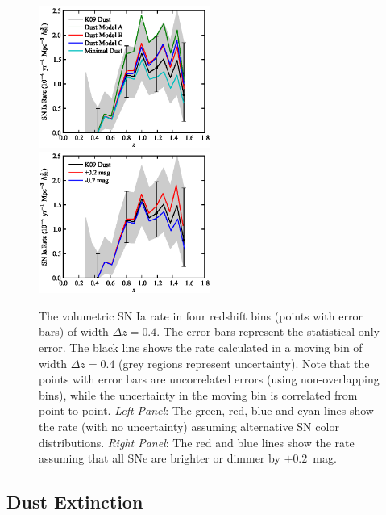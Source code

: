 \begin{figure}
\begin{center}
\includegraphics[width=0.5\textwidth]{figures/fieldrate/fieldrates1.eps}%
\includegraphics[width=0.5\textwidth]{figures/fieldrate/fieldrates2.eps}
\end{center}
\caption[Volumetric SN Ia rate results with systematic 
uncertainties]{The volumetric SN Ia rate in four redshift bins (points
with error bars) of width $\Delta z = 0.4$. The error bars represent
the statistical-only error. The black line shows the rate calculated
in a moving bin of width $\Delta z = 0.4$ (grey regions represent
uncertainty). Note that the points with error bars are uncorrelated
errors (using non-overlapping bins), while the uncertainty in the
moving bin is correlated from point to point.
\emph{Left Panel}: The green, red, blue and cyan lines show the 
rate (with no uncertainty) assuming alternative SN color distributions.
\emph{Right Panel}: The red and blue lines show the rate assuming 
that all SNe are brighter or dimmer by $\pm 0.2$~mag.
\label{fig:fieldrates1}}
\end{figure}

\subsection{Dust Extinction} \label{sec:sysdust}

